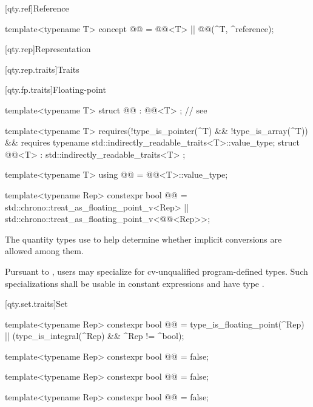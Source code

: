 [qty.ref]{Reference}

\begin{itemdecl}
template<typename T>
concept @@ = @@<T> || @@(^T, ^reference);
\end{itemdecl}

[qty.rep]{Representation}

[qty.rep.traits]{Traits}

[qty.fp.traits]{Floating-point}

\begin{itemdecl}
template<typename T>
struct @@ : @@<T> {}; // see 

template<typename T>
  requires(!type_is_pointer(^T) && !type_is_array(^T)) &&
          requires { typename std::indirectly_readable_traits<T>::value_type; }
struct @@<T> : std::indirectly_readable_traits<T> {};

template<typename T>
using @@ = @@<T>::value_type;

template<typename Rep>
constexpr bool @@ =
  std::chrono::treat_as_floating_point_v<Rep> ||
  std::chrono::treat_as_floating_point_v<@@<Rep>>;
\end{itemdecl}

\begin{itemdescr}
\pnum
The quantity types use 
to help determine whether implicit conversions are allowed among them.

\pnum
\remarks
Pursuant to ,
users may specialize 
for cv-unqualified program-defined types.
Such specializations shall be usable in constant expressions
and have type .
\end{itemdescr}

[qty.set.traits]{Set}

\begin{itemdecl}
template<typename Rep>
constexpr bool @@ =
  type_is_floating_point(^Rep) || (type_is_integral(^Rep) && ^Rep != ^bool);

template<typename Rep>
constexpr bool @@ = false;

template<typename Rep>
constexpr bool @@ = false;

template<typename Rep>
constexpr bool @@ = false;
\end{itemdecl}

